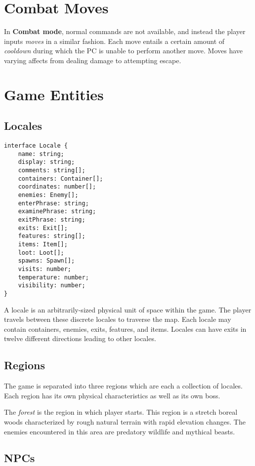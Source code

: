 \documentclass[11pt]{article}
\begin{document}
	\section{Combat Moves}
	In \textbf{Combat mode}, normal commands are not available, and instead the player inputs \textit{moves} in a similar fashion. Each move entails a certain amount of \textit{cooldown} during which the PC is unable to perform another move. Moves have varying affects from dealing damage to attempting escape.
	
	\section{Game Entities}
	\subsection{Locales}

	\begin{lstlisting}
interface Locale {
	name: string;
	display: string;
	comments: string[];
	containers: Container[];
	coordinates: number[];
	enemies: Enemy[];
	enterPhrase: string;
	examinePhrase: string;
	exitPhrase: string;
	exits: Exit[];
	features: string[];
	items: Item[];
	loot: Loot[];
	spawns: Spawn[];
	visits: number;
	temperature: number;
	visibility: number;
}
	\end{lstlisting}
	
	A locale is an arbitrarily-sized physical unit of space within the game. The player travels between these discrete locales to traverse the map. Each locale may contain containers, enemies, exits, features, and items. Locales can have exits in twelve different directions leading to other locales.
	
	\subsection{Regions}
	
	The game is separated into three regions which are each a collection of locales. Each region has its own physical characteristics as well as its own boss.
	
	The \textit{forest} is the region in which player starts. This region is a stretch boreal woods characterized by rough natural terrain with rapid elevation changes. The enemies encountered in this area are predatory wildlife and mythical beasts.
	
	\subsection{NPCs}
	
\end{document}
